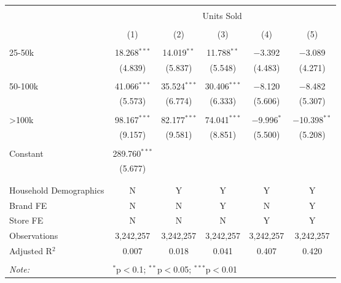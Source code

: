
\begin{table}[!htbp] \centering 
  \caption{} 
  \label{} 
\begin{tabular}{@{\extracolsep{5pt}}lccccc} 
\\[-1.8ex]\hline 
\hline \\[-1.8ex] 
 & \multicolumn{5}{c}{Units Sold} \\ 
\cline{2-6} 
\\[-1.8ex] & (1) & (2) & (3) & (4) & (5)\\ 
\hline \\[-1.8ex] 
 25-50k & 18.268$^{***}$ & 14.019$^{**}$ & 11.788$^{**}$ & $-$3.392 & $-$3.089 \\ 
  & (4.839) & (5.837) & (5.548) & (4.483) & (4.271) \\ 
  & & & & & \\ 
 50-100k & 41.066$^{***}$ & 35.524$^{***}$ & 30.406$^{***}$ & $-$8.120 & $-$8.482 \\ 
  & (5.573) & (6.774) & (6.333) & (5.606) & (5.307) \\ 
  & & & & & \\ 
 >100k & 98.167$^{***}$ & 82.177$^{***}$ & 74.041$^{***}$ & $-$9.996$^{*}$ & $-$10.398$^{**}$ \\ 
  & (9.157) & (9.581) & (8.851) & (5.500) & (5.208) \\ 
  & & & & & \\ 
 Constant & 289.760$^{***}$ &  &  &  &  \\ 
  & (5.677) &  &  &  &  \\ 
  & & & & & \\ 
\hline \\[-1.8ex] 
Household Demographics & N & Y & Y & Y & Y \\ 
Brand FE & N & N & Y & N & Y \\ 
Store FE & N & N & N & Y & Y \\ 
Observations & 3,242,257 & 3,242,257 & 3,242,257 & 3,242,257 & 3,242,257 \\ 
Adjusted R$^{2}$ & 0.007 & 0.018 & 0.041 & 0.407 & 0.420 \\ 
\hline 
\hline \\[-1.8ex] 
\textit{Note:}  & \multicolumn{5}{l}{$^{*}$p$<$0.1; $^{**}$p$<$0.05; $^{***}$p$<$0.01} \\ 
\end{tabular} 
\end{table} 
